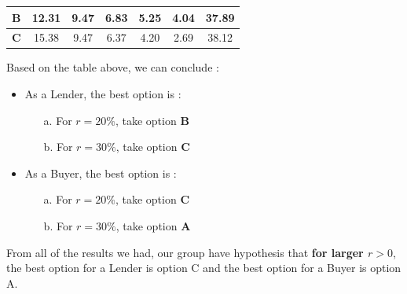 \documentclass{article}
\begin{document}
\begin{enumerate}
\begin{itemize}
\begin{center}
\begin{tabular}{|c|c|c|c|c|c|c|}
				\textbf{B}&12.31&9.47&6.83&5.25&4.04&37.89\\\hline
				\textbf{C}&15.38&9.47&6.37&4.20&2.69&38.12\\\hline
			\end{tabular}
		\end{center}
	\end{itemize}
		Based on the table above, we can conclude :
		\begin{itemize}
			\item As a Lender, the best option is :
			\begin{itemize}
				\item[a.] For $r=20\%$, take option \textbf{B}
				\item[b.] For $r=30\%$, take option \textbf{C}
			\end{itemize}
			\item As a Buyer, the best option is : 
			\begin{itemize}
				\item[a.] For $r=20\%$, take option \textbf{C}
				\item[b.] For $r=30\%$, take option \textbf{A}
			\end{itemize}
		\end{itemize}\vspace{0.5cm}
		From all of the results we had, our group have hypothesis that \textbf{for larger $r>0$}, the best option for a Lender is option C and the best option for a Buyer is option A.
		

\end{enumerate}
\end{document}
